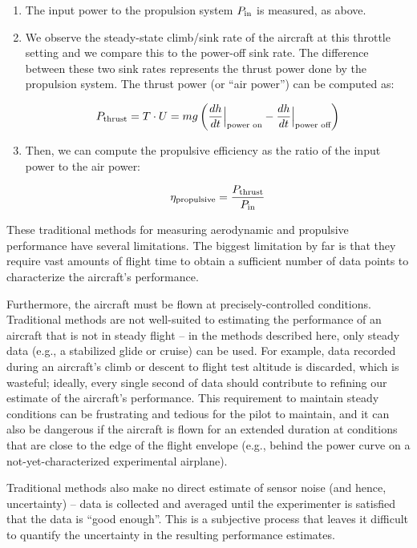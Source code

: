 \begin{enumerate}
    \item The input power to the propulsion system $P_{\rm in}$ is measured, as above.
    \item We observe the steady-state climb/sink rate of the aircraft at this throttle setting and we compare this to the power-off sink rate. The difference between these two sink rates represents the thrust power done by the propulsion system. The thrust power (or ``air power'') can be computed as:

    $$P_{\rm thrust}=T \cdot U = m g \left( \frac{dh}{dt}\Big |_\text{power on} - \frac{dh}{dt}\Big |_\text{power off} \right)$$

    \item Then, we can compute the propulsive efficiency as the ratio of the input power to the air power:

    $$\eta_{\rm propulsive} = \frac{P_{\rm thrust}}{P_{\rm in}}$$

\end{enumerate}

These traditional methods for measuring aerodynamic and propulsive performance have several limitations. The biggest limitation by far is that they require vast amounts of flight time to obtain a sufficient number of data points to characterize the aircraft's performance.

Furthermore, the aircraft must be flown at precisely-controlled conditions. Traditional methods are not well-suited to estimating the performance of an aircraft that is not in steady flight -- in the methods described here, only steady data (e.g., a stabilized glide or cruise) can be used. For example, data recorded during an aircraft's climb or descent to flight test altitude is discarded, which is wasteful; ideally, every single second of data should contribute to refining our estimate of the aircraft's performance. This requirement to maintain steady conditions can be frustrating and tedious for the pilot to maintain, and it can also be dangerous if the aircraft is flown for an extended duration at conditions that are close to the edge of the flight envelope (e.g., behind the power curve on a not-yet-characterized experimental airplane).

Traditional methods also make no direct estimate of sensor noise (and hence, uncertainty) -- data is collected and averaged until the experimenter is satisfied that the data is ``good enough''. This is a subjective process that leaves it difficult to quantify the uncertainty in the resulting performance estimates.

